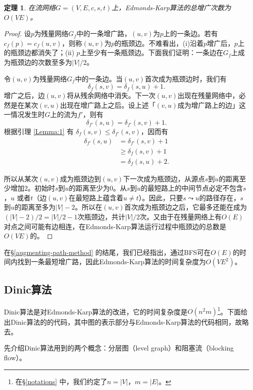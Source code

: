 \documentclass[a4paper]{ctexbook}
\newtheorem{theorem}{定理}[chapter] %
\begin{document}
  \begin{theorem}\label{T:number-of-augmentations}
      在流网络$G=(V,E,c,s,t)$上，Edmonds-Karp算法的总增广次数为$O(VE)$。
  \end{theorem}
  \begin{proof}
      设$p$为残量网络$G_f$中的一条增广路，$(u,v)$为$p$上的一条边。若有$c_f(p) = c_f(u,v)$，则称$(u,v)$为$p$的瓶颈边。不难看出，(i)沿着$p$增广后，$p$上的瓶颈边都消失了；(ii) $p$上至少有一条瓶颈边。下面我们证明：一条边在$G_f$上成为瓶颈边的次数至多为$|V|/2$。

      令$(u,v)$为残量网络$G_f$中的一条边。当$(u,v)$首次成为瓶颈边时，我们有
      \[
      \delta_f(s,v) = \delta_f(s,u) + 1 .
      \]
      增广之后，边$(u,v)$将从残余网络中消失。下一次$(u,v)$出现在残量网络中，必然是在某次$(v,u)$出现在增广路上之后。设上述「$(v,u)$成为增广路上的边」这一情况发生时$G$上的流为$f'$，则有
      \[
      \delta_{f'}(s,u) = \delta_{f'}(s,v) + 1.
      \]
      根据引理 \ref{Lemma:1} 有 $\delta_f(s,v)\le\delta_{f'}(s,v)$，因而有
      \begin{align*}
          \delta_{f'}(s,u) &= \delta_{f'}(s,v) + 1 \\
          &\ge \delta_f(s,v) + 1 \\
          &= \delta_f(s,u) + 2 .
      \end{align*}

      所以从某次$(u,v)$成为瓶颈边到$(u,v)$下一次成为瓶颈边，从源点$s$到$u$的距离至少增加$2$。初始时$s$到$u$的距离至少为$0$。从$s$到$u$的最短路上的中间节点必定不包含$s$，$u$ 或者$t$（边$(u,v)$在最短路上蕴含着$u\ne t$）。因此，只要$s\leadsto u$的路径存在，$s$到$u$的距离至多为$|V|-2$。所以在$(u,v)$首次成为瓶颈边之后，它最多还能在成为$(|V|-2)/2=|V|/2-1$次瓶颈边，共计$|V|/2$次。又由于在残量网络上有$O(E)$对点之间可能有边相连，在Edmonds-Karp算法运行过程中瓶颈边的总数是$O(VE)$的。
  \end{proof}

  在\S\ref{augmenting-path-method} 的结尾，我们已经指出，通过BFS可在$O(E)$的时间内找到一条最短增广路，因此Edmonds-Karp算法的时间复杂度为$O(VE^2)$。
  \subsection{Dinic算法}
  
  Dinic算法是对Edmonds-Karp算法的改进，它的时间复杂度是$O(n^2m)$\footnote{在\S\ref{notations} 中，我们约定了$n=|V|$，$m=|E|$。}。下面给出Dinic算法的的代码，其中图的表示部分与Edmonds-Karp算法的代码相同，故略去。

  先介绍Dinic算法用到的两个概念：分层图（level graph）和阻塞流（blocking flow）。
\end{document}
